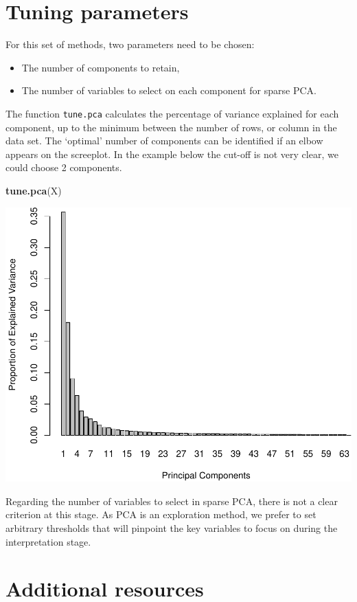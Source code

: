 \documentclass[]{book}
\newenvironment{Shaded}{\begin{snugshade}}{\end{snugshade}}
\newcommand{\KeywordTok}[1]{\textcolor[rgb]{0.13,0.29,0.53}{\textbf{#1}}}
\newcommand{\NormalTok}[1]{#1}
\providecommand{\tightlist}{%
  \setlength{\itemsep}{0pt}\setlength{\parskip}{0pt}}
\begin{document}
\hypertarget{tuning-parameters}{%
\section{Tuning parameters}\label{tuning-parameters}}

For this set of methods, two parameters need to be chosen:

\begin{itemize}
\tightlist
\item
  The number of components to retain,
\item
  The number of variables to select on each component for sparse PCA.
\end{itemize}

The function \texttt{tune.pca} calculates the percentage of variance explained for each component, up to the minimum between the number of rows, or column in the data set. The `optimal' number of components can be identified if an elbow appears on the screeplot. In the example below the cut-off is not very clear, we could choose 2 components.

\begin{Shaded}
\begin{Highlighting}[]
\KeywordTok{tune.pca}\NormalTok{(X)}
\end{Highlighting}
\end{Shaded}

\begin{center}\includegraphics[width=0.5\linewidth,]{Figures/03-tune-pca-1} \end{center}

Regarding the number of variables to select in sparse PCA, there is not a clear criterion at this stage. As PCA is an exploration method, we prefer to set arbitrary thresholds that will pinpoint the key variables to focus on during the interpretation stage.

\hypertarget{additional-resources}{%
\section{Additional resources}\label{additional-resources}}
\end{document}
